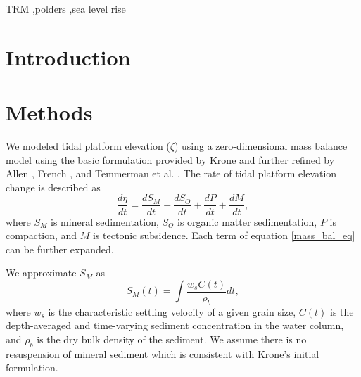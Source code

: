 \documentclass[a4paper,fleqn]{cas-dc}
\begin{document}

\begin{keywords}
TRM \sep polders \sep sea level rise
\end{keywords}

\maketitle

\section{Introduction}

\section{Methods}

We modeled tidal platform elevation ($\zeta$) using a zero-dimensional mass balance model using the basic formulation provided by Krone \citet{kroneMethodSimulatingMarsh1987} and further refined by Allen \citet{allenSaltmarshGrowthStratification1990}, French \citet{frenchNumericalSimulationVertical1993}, and Temmerman et al. \citet{temmermanModellingLongtermTidal2003,temmermanModellingEstuarineVariations2004}. The rate of tidal platform elevation change is described as
\begin{equation}\label{mass_bal_eq}
	\frac{d \eta}{d t} = \frac{d S_M}{d t} + \frac{d S_O}{d t} + \frac{d P}{d t} + \frac{d M}{d t},
\end{equation}
where $S_M$ is mineral sedimentation, $S_O$ is organic matter sedimentation, $P$ is compaction, and $M$ is tectonic subsidence. Each term of equation \ref{mass_bal_eq} can be further expanded.

We approximate $S_M$ as
\begin{equation}\label{min_sed_eq}
	S_M(t) = \int{\frac{w_{s}C(t)}{\rho_b}dt},
\end{equation}
where $w_s$ is the characteristic settling velocity of a given grain size, $C(t)$ is the depth-averaged and time-varying sediment concentration in the water column, and $\rho_b$ is the dry bulk density of the sediment. We assume there is no resuspension of mineral sediment which is consistent with Krone's \citet{kroneMethodSimulatingMarsh1987} initial formulation.
\end{document}
